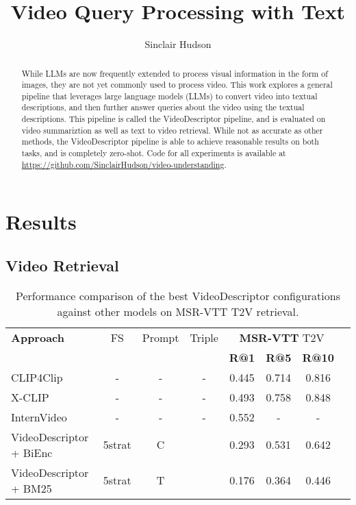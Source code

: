 \documentclass{article}
\title{Video Query Processing with Text}
\author{Sinclair Hudson}
\begin{document}
\maketitle

\begin{abstract}
      While LLMs are now frequently extended to process visual information in the form of images, they are not yet commonly used to process video.
      This work explores a general pipeline that leverages large language models (LLMs) to convert video into textual descriptions, and then further answer queries about the video using the textual descriptions.
      This pipeline is called the VideoDescriptor pipeline, and is evaluated on video summariztion as well as text to video retrieval.
      While not as accurate as other methods, the VideoDescriptor pipeline is able to achieve reasonable results on both tasks, and is completely zero-shot.
      Code for all experiments is available at \url{https://github.com/SinclairHudson/video-understanding}.
\end{abstract}







\section{Results}

\subsection{Video Retrieval}

\begin{table}[htbp]
  \centering
  \begin{tabular}{lccccccc}
    \toprule
    \textbf{Approach} &FS & Prompt & Triple & \multicolumn{3}{c}{\textbf{MSR-VTT} T2V} \\
    \cmidrule(lr){5-7}
                      &&&& \textbf{R@1} & \textbf{R@5} & \textbf{R@10} \\
    \midrule
    CLIP4Clip \cite{clip4clip} &-&-&-& 0.445 & 0.714 &  0.816\\
    \midrule
    X-CLIP \cite{xclip} &-&-&-& 0.493 & 0.758 & 0.848 \\
    \midrule
    InternVideo \cite{internvideo} &-&-&-& 0.552 & - & - \\
    \bottomrule
    VideoDescriptor + BiEnc &5strat&C& & 0.293 & 0.531 & 0.642 \\
    \midrule
    VideoDescriptor + BM25 &5strat&T& & 0.176 & 0.364 & 0.446 \\
  \end{tabular}
  \caption{Performance comparison of the best VideoDescriptor configurations against other models on MSR-VTT T2V retrieval.}
  \label{tab:model_comparison}
\end{table}
\end{document}
